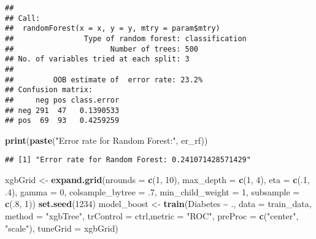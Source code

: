\documentclass[
]{article}
\newenvironment{Shaded}{\begin{snugshade}}{\end{snugshade}}
\newcommand{\AttributeTok}[1]{\textcolor[rgb]{0.13,0.29,0.53}{#1}}
\newcommand{\DecValTok}[1]{\textcolor[rgb]{0.00,0.00,0.81}{#1}}
\newcommand{\FunctionTok}[1]{\textcolor[rgb]{0.13,0.29,0.53}{\textbf{#1}}}
\newcommand{\NormalTok}[1]{#1}
\newcommand{\OtherTok}[1]{\textcolor[rgb]{0.56,0.35,0.01}{#1}}
\newcommand{\SpecialCharTok}[1]{\textcolor[rgb]{0.81,0.36,0.00}{\textbf{#1}}}
\newcommand{\StringTok}[1]{\textcolor[rgb]{0.31,0.60,0.02}{#1}}
\begin{document}
\begin{verbatim}
## 
## Call:
##  randomForest(x = x, y = y, mtry = param$mtry) 
##                Type of random forest: classification
##                      Number of trees: 500
## No. of variables tried at each split: 3
## 
##         OOB estimate of  error rate: 23.2%
## Confusion matrix:
##     neg pos class.error
## neg 291  47   0.1390533
## pos  69  93   0.4259259
\end{verbatim}

\begin{Shaded}
\begin{Highlighting}[]
\FunctionTok{print}\NormalTok{(}\FunctionTok{paste}\NormalTok{(}\StringTok{"Error rate for Random Forest:"}\NormalTok{, er\_rf))}
\end{Highlighting}
\end{Shaded}

\begin{verbatim}
## [1] "Error rate for Random Forest: 0.241071428571429"
\end{verbatim}

\begin{Shaded}
\begin{Highlighting}[]
\NormalTok{xgbGrid }\OtherTok{\textless{}{-}} \FunctionTok{expand.grid}\NormalTok{(}\AttributeTok{nrounds =} \FunctionTok{c}\NormalTok{(}\DecValTok{1}\NormalTok{, }\DecValTok{10}\NormalTok{),}
                       \AttributeTok{max\_depth =} \FunctionTok{c}\NormalTok{(}\DecValTok{1}\NormalTok{, }\DecValTok{4}\NormalTok{),}
                       \AttributeTok{eta =} \FunctionTok{c}\NormalTok{(.}\DecValTok{1}\NormalTok{, .}\DecValTok{4}\NormalTok{),}
                       \AttributeTok{gamma =} \DecValTok{0}\NormalTok{,}
                       \AttributeTok{colsample\_bytree =}\NormalTok{ .}\DecValTok{7}\NormalTok{,}
                       \AttributeTok{min\_child\_weight =} \DecValTok{1}\NormalTok{,}
                       \AttributeTok{subsample =} \FunctionTok{c}\NormalTok{(.}\DecValTok{8}\NormalTok{, }\DecValTok{1}\NormalTok{))}
\FunctionTok{set.seed}\NormalTok{(}\DecValTok{1234}\NormalTok{)}
\NormalTok{model\_boost }\OtherTok{\textless{}{-}} \FunctionTok{train}\NormalTok{(Diabetes }\SpecialCharTok{\textasciitilde{}}\NormalTok{ ., }
                     \AttributeTok{data =}\NormalTok{ train\_data, }
                     \AttributeTok{method =} \StringTok{"xgbTree"}\NormalTok{,}
                     \AttributeTok{trControl =}\NormalTok{ ctrl,}\AttributeTok{metric =} \StringTok{"ROC"}\NormalTok{,}
                     \AttributeTok{preProc =} \FunctionTok{c}\NormalTok{(}\StringTok{"center"}\NormalTok{, }\StringTok{"scale"}\NormalTok{),}
                     \AttributeTok{tuneGrid =}\NormalTok{ xgbGrid)}
\end{Highlighting}
\end{Shaded}
\end{document}
